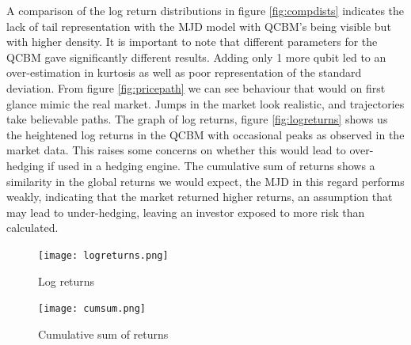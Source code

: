 \documentclass[12pt]{article}
\numberwithin{equation}{section}
\begin{document}
A comparison of the log return distributions in figure \ref{fig:compdists}  
indicates the lack of tail representation 
with the MJD model with QCBM's being visible but with higher density. 
It is important to note that different parameters for the QCBM 
gave significantly different results. Adding only 1 more qubit led to an 
over-estimation in kurtosis as well as poor representation of the standard 
deviation. From figure \ref{fig:pricepath} we can see behaviour that would on 
first glance mimic the real market. Jumps in the market look realistic, and 
trajectories take believable paths. The graph of log returns, figure \ref{fig:logreturns} 
shows us the heightened 
log returns in the QCBM with occasional peaks as observed in the market data.
This raises some concerns on whether this would lead to over-hedging if used in 
a hedging engine. The cumulative sum of returns shows a similarity in the global 
returns we would expect, the MJD in this regard performs weakly, indicating that 
the market returned higher returns, an assumption that may lead to under-hedging,
leaving an investor exposed to more risk than calculated. 

\begin{figure}[h!]
    \centering
    \begin{minipage}{0.48\textwidth}
        \centering
        \texttt{[image: logreturns.png]}
        \caption{Log returns}
        \label{fig:logreturns}
    \end{minipage}
    \hfill
    \begin{minipage}{0.48\textwidth}
        \centering
        \texttt{[image: cumsum.png]}
        \caption{Cumulative sum of returns}
        \label{fig:cumsum}
    \end{minipage}
\end{figure}
\end{document}

